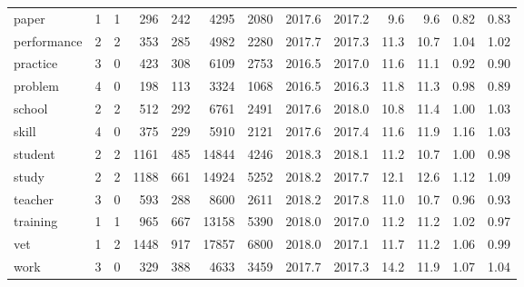 \begin{tabular}{l|cc|rr|rr|rr|rr|rr}
paper & 1 & 1 & 296 & 242 & 4295 & 2080 & 2017.6 & 2017.2 & 9.6 & 9.6 & 0.82 & 0.83 \\
performance & 2 & 2 & 353 & 285 & 4982 & 2280 & 2017.7 & 2017.3 & 11.3 & 10.7 & 1.04 & 1.02 \\
practice & 3 & 0 & 423 & 308 & 6109 & 2753 & 2016.5 & 2017.0 & 11.6 & 11.1 & 0.92 & 0.90 \\
problem & 4 & 0 & 198 & 113 & 3324 & 1068 & 2016.5 & 2016.3 & 11.8 & 11.3 & 0.98 & 0.89 \\
school & 2 & 2 & 512 & 292 & 6761 & 2491 & 2017.6 & 2018.0 & 10.8 & 11.4 & 1.00 & 1.03 \\
skill & 4 & 0 & 375 & 229 & 5910 & 2121 & 2017.6 & 2017.4 & 11.6 & 11.9 & 1.16 & 1.03 \\
student & 2 & 2 & 1161 & 485 & 14844 & 4246 & 2018.3 & 2018.1 & 11.2 & 10.7 & 1.00 & 0.98 \\
study & 2 & 2 & 1188 & 661 & 14924 & 5252 & 2018.2 & 2017.7 & 12.1 & 12.6 & 1.12 & 1.09 \\
teacher & 3 & 0 & 593 & 288 & 8600 & 2611 & 2018.2 & 2017.8 & 11.0 & 10.7 & 0.96 & 0.93 \\
training & 1 & 1 & 965 & 667 & 13158 & 5390 & 2018.0 & 2017.0 & 11.2 & 11.2 & 1.02 & 0.97 \\
vet & 1 & 2 & 1448 & 917 & 17857 & 6800 & 2018.0 & 2017.1 & 11.7 & 11.2 & 1.06 & 0.99 \\
work & 3 & 0 & 329 & 388 & 4633 & 3459 & 2017.7 & 2017.3 & 14.2 & 11.9 & 1.07 & 1.04 \\
\hline
\end{tabular}